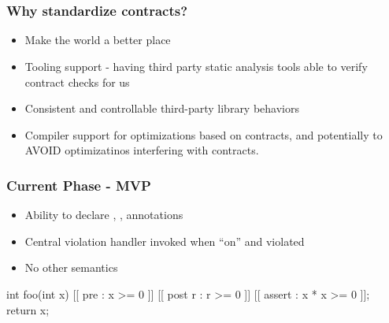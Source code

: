 
\section{}
\begin{frame}[fragile]
  \frametitle{Why standardize contracts?}
\begin{itemize}

\item Make the world a better place
\item Tooling support - having third party static analysis tools able to
  verify contract checks for us
\item Consistent and controllable third-party library behaviors
\item Compiler support for optimizations based on contracts, and
  potentially to AVOID optimizatinos interfering with contracts.
\end{itemize}
\end{frame}

\begin{frame}[fragile]
  \frametitle{Current Phase - MVP}

  \begin{itemize}
  \item Ability to declare \cc{[[pre]]}, \cc{[[post]]}, \cc{[[assert]]} annotations
  \item Central violation handler invoked when ``on'' and violated
  \item No other semantics
  \end{itemize}

  \begin{cppcodebox}
  int foo(int x)
    [[ pre : x >= 0 ]]
    [[ post r : r >= 0 ]]
  {
    [[ assert : x * x >= 0 ]];
    return x;
  }
  \end{cppcodebox}

\end{frame}

